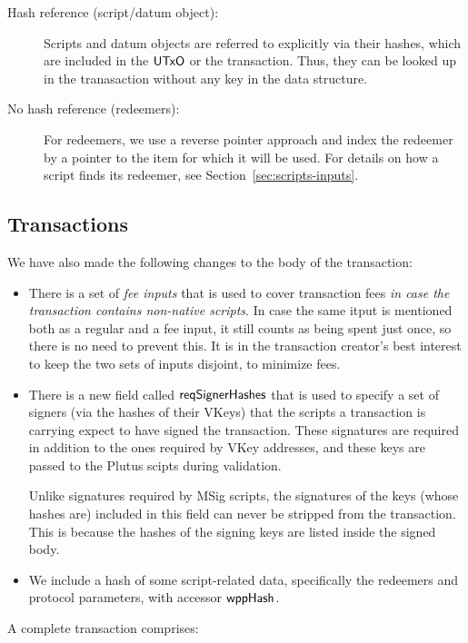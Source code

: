 \begin{description}
\item
  [Hash reference (script/datum object):]
  Scripts and datum objects are referred to explicitly via their hashes,
  which are included in the $\mathsf{UTxO}$ or the transaction. Thus, they can be
  looked up in the tranasaction without any key in the data structure.

  \item[No hash reference (redeemers):] For redeemers,
  we use a reverse pointer approach and
  index the redeemer by a pointer to the item for which it will be used.
  For details on how a script finds its redeemer, see Section~\ref{sec:scripts-inputs}.
\end{description}

\subsection{Transactions}
We have also made the following changes to
the body of the transaction:

\begin{itemize}
  \item There is a set of \emph{fee inputs} that is used to cover transaction fees
    \emph{in case the transaction contains non-native scripts}. In case the same itput is mentioned both as
    a regular and a fee input, it still counts as being spent just once, so there is no need to prevent this.
    It is in the transaction creator's best interest to keep the two sets of inputs disjoint, to minimize fees.
  \item There is a new field called $\mathsf{reqSignerHashes}$ that is used to specify a set of signers (via the
    hashes of their VKeys) that the scripts a transaction is carrying expect to have signed the transaction.
    These signatures are required in addition to the ones required by VKey addresses, and
    these keys are passed to the Plutus scipts during validation.

    Unlike signatures required by MSig scripts, the signatures of the keys
    (whose hashes are) included
    in this field can never be stripped from the transaction. This is because
    the hashes of the signing keys are listed inside the signed body.
  \item We include a hash of some script-related data, specifically the redeemers and protocol parameters,
    with accessor $\mathsf{wppHash}$.
\end{itemize}

A complete transaction comprises:

